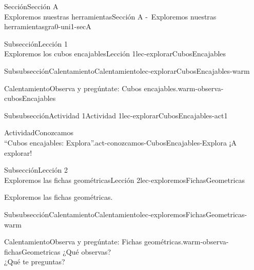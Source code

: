 \begin{sectionptx}{Sección}{{\Large Sección A\\}Exploremos nuestras herramientas}{}{Sección A -~Exploremos nuestras herramientas}{}{}{gra0-uni1-secA}
\begin{subsectionptx}{Subsección}{{\normalsize Lección 1\\[-0.05cm]}Exploremos los cubos encajables}{}{Lección 1}{}{}{lec-explorarCubosEncajables}
\begin{subsubsectionptx}{Subsubsección}{Calentamiento}{}{Calentamiento}{}{}{lec-explorarCubosEncajables-warm}
\begin{exploration}{Calentamiento}{Observa y pregúntate: Cubos encajables.}{warm-observa-cubosEncajables}
\begin{image}{0}{1}{0}{}
\end{image}%
\end{exploration}%
\end{subsubsectionptx}
%
%
\typeout{************************************************}
\typeout{************************************************}
%
\begin{subsubsectionptx}{Subsubsección}{Actividad 1}{}{Actividad 1}{}{}{lec-explorarCubosEncajables-act1}
\begin{activity}{Actividad}{Conozcamos\\“Cubos encajables: Explora”.}{act-conozcamos-CubosEncajables-Explora}%
¡A explorar!%
\end{activity}%
\end{subsubsectionptx}
\end{subsectionptx}
%
%
\typeout{************************************************}
\typeout{************************************************}
%
\begin{subsectionptx}{Subsección}{{\normalsize Lección 2\\[-0.05cm]}Exploremos las fichas geométricas}{}{Lección 2}{}{}{lec-exploremosFichasGeometricas}
\begin{introduction}{}%
Exploremos las fichas geométricas.%
\end{introduction}%
%
%
\typeout{************************************************}
\typeout{************************************************}
%
\begin{subsubsectionptx}{Subsubsección}{Calentamiento}{}{Calentamiento}{}{}{lec-exploremosFichasGeometricas-warm}
\begin{exploration}{Calentamiento}{Observa y pregúntate: Fichas geométricas.}{warm-observa-fichasGeometricas}%
¿Qué observas?\\
 ¿Qué te preguntas?%
\begin{image}{0}{1}{0}{}%

\end{image}
\end{exploration}
\end{subsubsectionptx}
\end{subsectionptx}
\end{sectionptx}
